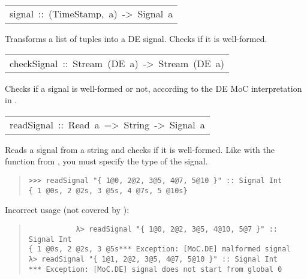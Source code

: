 \begin{haddockdesc}
\item[\begin{tabular}{@{}l}
signal\ ::\ {\char 91}(TimeStamp,\ a){\char 93}\ ->\ Signal\ a
\end{tabular}]\haddockbegindoc
Transforms a list of tuples  into a DE
 signal. Checks if it is well-formed.\par

\end{haddockdesc}
\begin{haddockdesc}
\item[\begin{tabular}{@{}l}
checkSignal\ ::\ Stream\ (DE\ a)\ ->\ Stream\ (DE\ a)
\end{tabular}]\haddockbegindoc
Checks if a signal is well-formed or not, according to the DE MoC
 interpretation in .\par

\end{haddockdesc}
\begin{haddockdesc}
\item[\begin{tabular}{@{}l}
readSignal\ ::\ Read\ a\ =>\ String\ ->\ Signal\ a
\end{tabular}]\haddockbegindoc
Reads a signal from a string and checks if it is well-formed.
 Like with the  function from , you must specify the
 type of the signal.\par
\begin{quote}
{\haddockverb\begin{verbatim}
>>> readSignal "{ 1@0, 2@2, 3@5, 4@7, 5@10 }" :: Signal Int
{ 1 @0s, 2 @2s, 3 @5s, 4 @7s, 5 @10s}

\end{verbatim}}
\end{quote}Incorrect usage (not covered by ):\par
           \begin{quote}
           {\haddockverb\begin{verbatim}
           λ> readSignal "{ 1@0, 2@2, 3@5, 4@10, 5@7 }" :: Signal Int
{ 1 @0s, 2 @2s, 3 @5s*** Exception: [MoC.DE] malformed signal
λ> readSignal "{ 1@1, 2@2, 3@5, 4@7, 5@10 }" :: Signal Int
*** Exception: [MoC.DE] signal does not start from global 0\end{verbatim}}
           \end{quote}
           
\end{haddockdesc}
